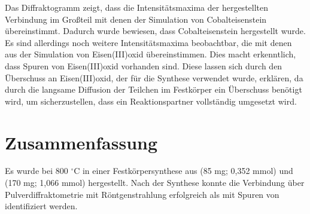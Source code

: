 \documentclass[a4paper,12pt,bibliography=totocnumbered]{scrartcl}
\begin{document}
Das Diffraktogramm zeigt, dass die Intensitätsmaxima der hergestellten Verbindung im Großteil mit denen der Simulation von Cobalteisenstein übereinstimmt.
Dadurch wurde bewiesen, dass Cobalteisenstein hergestellt wurde. Es sind allerdings noch weitere Intensitätsmaxima beobachtbar, die mit denen aus der Simulation von Eisen(III)oxid übereinstimmen.
Dies macht erkenntlich, dass Spuren von Eisen(III)oxid vorhanden sind. Diese lassen sich durch den Überschuss an Eisen(III)oxid, der für die Synthese verwendet wurde, erklären, 
da durch die langsame Diffusion der Teilchen im Festkörper ein Überschuss benötigt wird, um sicherzustellen, dass ein Reaktionspartner vollständig umgesetzt wird.  



\section{Zusammenfassung}
Es wurde  bei 800 $^\circ$C in einer Festkörpersynthese aus (85 mg; 0,352 mmol) und (170 mg; 1,066 mmol) hergestellt. 
Nach der Synthese konnte die Verbindung über Pulverdiffraktometrie mit Röntgenstrahlung erfolgreich als  mit Spuren von  identifiziert werden.

\newpage

\printbibliography[title={Literatur}]
\end{document}
